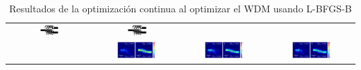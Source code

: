 \begin{landscape}
\begin{table}[ht]
\begin{tabular}{|c|c|c|c|}
      \includegraphics[width=0.24\textwidth]{image/results/wdm/L-BFGS-B/visualize_eps_disc_512.png} &
      \includegraphics[width=0.24\textwidth]{image/results/wdm/L-BFGS-B/visualize_eps_fab_512.png} \\
      \cline{2-4}
      &
      \includegraphics[width=0.50\textwidth]{image/results/wdm/L-BFGS-B/visualize_field_cont_512.png} &
      \includegraphics[width=0.50\textwidth]{image/results/wdm/L-BFGS-B/visualize_field_disc_512.png} &
      \includegraphics[width=0.50\textwidth]{image/results/wdm/L-BFGS-B/visualize_field_fab_512.png} \\
    \hline
    \end{tabular}
    \hspace*{-5cm}
    \caption{Resultados de la optimización continua al optimizar el WDM usando L-BFGS-B}
    \label{tab:opt-cont-L-BFGS-B-wdm}
\end{table}
\end{landscape}


